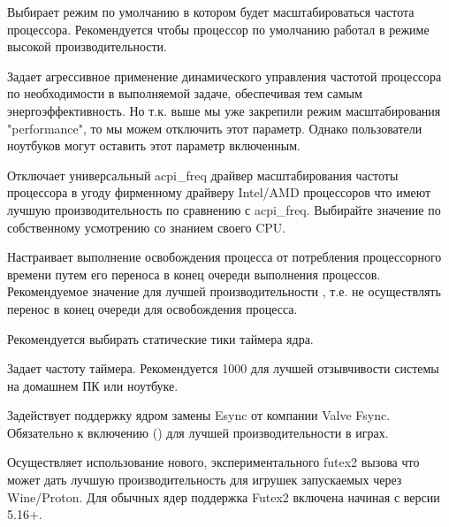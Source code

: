 \documentclass[letterpaper,10pt,russian,openany]{sphinxmanual}
\begin{document}
\sphinxAtStartPar
{} \sphinxhyphen{} Выбирает режим по умолчанию в котором будет масштабироваться частота процессора.
Рекомендуется  чтобы процессор по умолчанию работал в режиме высокой производительности.

\sphinxAtStartPar
{} \sphinxhyphen{} Задает агрессивное применение динамического управления частотой процессора по необходимости в выполняемой задаче,
обеспечивая тем самым энергоэффективность.
Но т.к. выше мы уже закрепили режим масштабирования "performance", то мы можем отключить этот параметр.
Однако пользователи ноутбуков могут оставить этот параметр включенным.

\sphinxAtStartPar
{} \sphinxhyphen{} Отключает универсальный acpi\_freq драйвер масштабирования частоты процессора в угоду фирменному драйверу Intel/AMD процессоров
что имеют лучшую производительность по сравнению с acpi\_freq.
Выбирайте значение по собственному усмотрению со знанием своего CPU.

\sphinxAtStartPar
{} \sphinxhyphen{} Настраивает выполнение освобождения процесса от потребления процессорного времени путем его переноса в конец очереди выполнения процессов.
Рекомендуемое значение для лучшей производительности \sphinxhyphen{} , т.е. не осуществлять перенос в конец очереди для освобождения процесса.

\sphinxAtStartPar
{} \sphinxhyphen{} Рекомендуется выбирать статические тики таймера ядра.

\sphinxAtStartPar
{} \sphinxhyphen{} Задает частоту таймера.
Рекомендуется 1000 для лучшей отзывчивости системы на домашнем ПК или ноутбуке.

\sphinxAtStartPar
{} \sphinxhyphen{} Задействует поддержку ядром замены Esync от компании Valve \sphinxhyphen{} Fsync.
Обязательно к включению () для лучшей производительности в играх.

\sphinxAtStartPar
{} \sphinxhyphen{} Осуществляет использование нового, экспериментального futex2 вызова что может дать лучшую производительность для игрушек запускаемых через Wine/Proton. Для обычных ядер поддержка Futex2 включена начиная с версии 5.16+.
\end{document}
